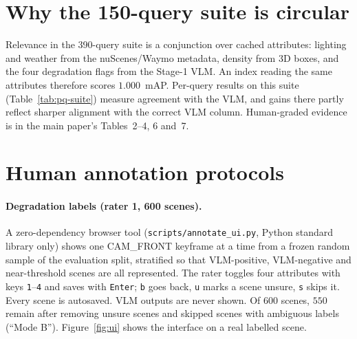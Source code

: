 \documentclass[10pt,letterpaper]{article}
\begin{document}
\begin{table}[H]\centering\small
\caption{\textbf{All columns of the main comparison} (main paper, Table~2). Stratum~5:
$40$ semantic queries graded by human 3D annotation on $258$ corpus scenes, and the
subset with $\ge3$ positives on the uncontaminated val150. 150Q suite: mAP and top-5
domain skew (points). ms: online cost per query on $1508$ cached scenes, one model,
A40, excluding text encoding. Portable: SigLIP2, VLM margins and metadata only.
n/a: the method needs a signal the corpus lacks. $^{\dagger}$reads the BEV
embedding or tags, which were supervised on corpus scenes. $^{\ddagger}$reads the
very attributes that define suite relevance. Subscripts: sd over five seeds.}
\label{tab:master-full}
\resizebox{\textwidth}{!}{}
\end{table}

\section{Why the 150-query suite is circular}
\label{sec:supp-circ}

Relevance in the 390-query suite is a conjunction over cached attributes:
lighting and weather from the nuScenes/Waymo metadata, density from 3D boxes, and
the four degradation flags from the Stage-1 VLM. An index reading the same
attributes therefore scores $1.000$~mAP. Per-query results on this suite
(Table~\ref{tab:pq-suite}) measure agreement with the VLM, and gains there
partly reflect sharper alignment with the correct VLM column. Human-graded evidence is in the main paper's Tables~2--4, 6
and~7.

\section{Human annotation protocols}

\paragraph{Degradation labels (rater 1, 600 scenes).} A zero-dependency
browser tool (\texttt{scripts/annotate\_ui.py}, Python standard library only)
shows one CAM\_FRONT keyframe at a time from a frozen random sample of the
evaluation split, stratified so that VLM-positive, VLM-negative and
near-threshold scenes are all represented. The rater toggles four attributes
with keys \texttt{1}--\texttt{4} and saves with \texttt{Enter}; \texttt{b} goes
back, \texttt{u} marks a scene unsure, \texttt{s} skips it. Every scene is
autosaved. VLM outputs are never shown. Of $600$ scenes, $550$ remain after
removing unsure scenes and skipped scenes with ambiguous labels (``Mode B'').
Figure~\ref{fig:ui} shows the interface on a real labelled scene.
\end{document}
